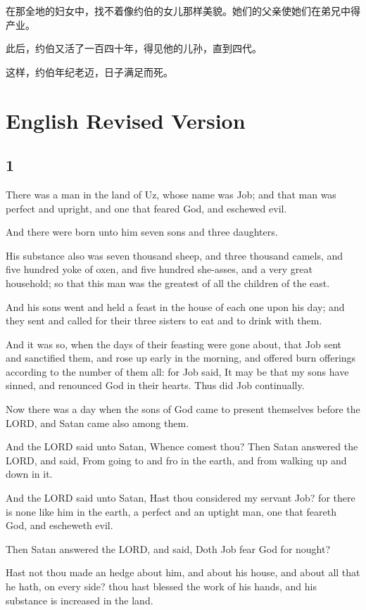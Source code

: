 \documentclass[12pt,oneside]{book}
\begin{document}
在那全地的妇女中，找不着像约伯的女儿那样美貌。她们的父亲使她们在弟兄中得产业。

此后，约伯又活了一百四十年，得见他的儿孙，直到四代。

这样，约伯年纪老迈，日子满足而死。


\part{English Revised Version}
\chapter{1}
There was a man in the land of Uz, whose name was Job; and that man was perfect and upright, and one that feared God, and eschewed evil.

And there were born unto him seven sons and three daughters.

His substance also was seven thousand sheep, and three thousand camels, and five hundred yoke of oxen, and five hundred she-asses, and a very great household; so that this man was the greatest of all the children of the east.

And his sons went and held a feast in the house of each one upon his day; and they sent and called for their three sisters to eat and to drink with them.

And it was so, when the days of their feasting were gone about, that Job sent and sanctified them, and rose up early in the morning, and offered burn offerings according to the number of them all: for Job said, It may be that my sons have sinned, and renounced God in their hearts. Thus did Job continually.

Now there was a day when the sons of God came to present themselves before the LORD, and Satan came also among them.

And the LORD said unto Satan, Whence comest thou? Then Satan answered the LORD, and said, From going to and fro in the earth, and from walking up and down in it.

And the LORD said unto Satan, Hast thou considered my servant Job? for there is none like him in the earth, a perfect and an uptight man, one that feareth God, and escheweth evil.

Then Satan answered the LORD, and said, Doth Job fear God for nought?

Hast not thou made an hedge about him, and about his house, and about all that he hath, on every side? thou hast blessed the work of his hands, and his substance is increased in the land.
\end{document}
